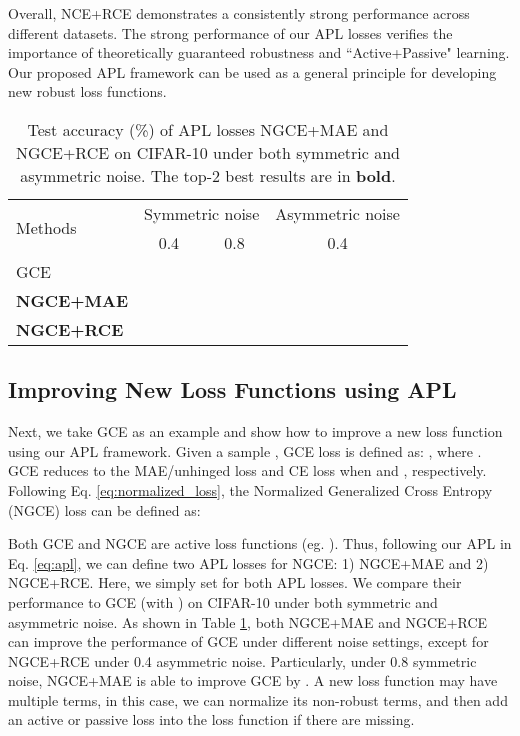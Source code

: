 \documentclass{article}
\begin{document}
Overall, NCE+RCE demonstrates a consistently strong performance across different datasets. 
The strong performance of our APL losses verifies the importance of theoretically guaranteed robustness and ``Active+Passive" learning.
Our proposed APL framework can be used as a general principle for developing new robust loss functions.



\begin{table}[!ht]
\vspace{-0.1 in}
    \small
    \centering
    \caption{Test accuracy (\%) of APL losses NGCE+MAE and NGCE+RCE on CIFAR-10 under both symmetric and asymmetric noise. The top-2 best results are in \textbf{bold}.}
\label{tab:ngce_plus}
    \begin{adjustbox}{width=0.49\textwidth}
    \begin{tabular}{l|cc|c}
    \hline
    \multirow{2}{*}{Methods}
    & \multicolumn{2}{c|}{Symmetric noise}  & \multicolumn{1}{c}{Asymmetric noise} \\
     & 0.4 & 0.8  & 0.4  \\
    \hline
    GCE &  &  &  \\
    \textbf{NGCE+MAE} &  &  &  \\
    \textbf{NGCE+RCE} &  &  &  \\
    \hline
    \end{tabular}
    \end{adjustbox}
\vspace{-0.1 in}
\end{table}

\subsection{Improving New Loss Functions using APL}\label{sec:ngce}
Next, we take GCE \cite{zhang2018generalized} as an example and show how to improve a new loss function using our APL framework.
Given a sample , GCE loss is defined as: ,
where . GCE reduces to the MAE/unhinged loss and CE loss when  and , respectively.
Following Eq. \eqref{eq:normalized_loss}, the Normalized Generalized Cross Entropy (NGCE) loss can be defined as:



Both GCE and NGCE are active loss functions (eg. ). Thus, following our APL in Eq. \eqref{eq:apl}, we can define two APL losses for NGCE: 1) NGCE+MAE and 2) NGCE+RCE. Here, we simply set  for both APL losses. We compare their performance to GCE (with ) on CIFAR-10 under both symmetric and asymmetric noise. As shown in Table \ref{tab:ngce_plus}, both NGCE+MAE and NGCE+RCE can improve the performance of GCE under different noise settings, except for NGCE+RCE under 0.4 asymmetric noise. Particularly, under 0.8 symmetric noise, NGCE+MAE is able to improve GCE by . A new loss function may have multiple terms, in this case, we can normalize its non-robust terms, and then add an active or passive loss into the loss function if there are missing.
\end{document}
